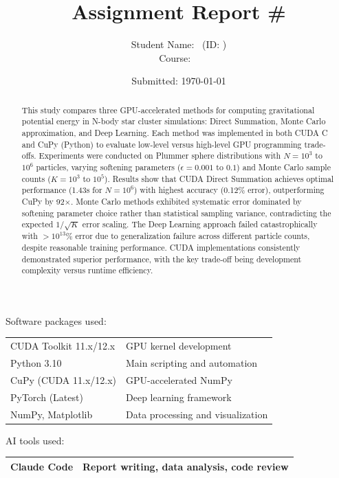 \documentclass[11pt,a4paper]{article}
\title{Assignment Report \#\assignmentnumber \\ \assignmenttitle}
\author{Student Name: \studentname \ (ID: \studentid) \\ Course: \coursecode \ \coursename}
\date{Submitted: \today}
\begin{document}
\maketitle

\begin{center}
{Software packages used:} \\
\begin{tabular}{|l|l|}
\hline
CUDA Toolkit 11.x/12.x & GPU kernel development \\
Python 3.10 & Main scripting and automation \\
CuPy (CUDA 11.x/12.x) & GPU-accelerated NumPy \\
PyTorch (Latest) & Deep learning framework \\
NumPy, Matplotlib & Data processing and visualization \\
\hline
\end{tabular}
\end{center}

\begin{center}
{AI tools used:} \\
\begin{tabular}{|l|l|}
\hline
Claude Code & Report writing, data analysis, code review \\
\hline
\end{tabular}
\end{center}
\vspace{2em}

\begin{abstract}
\noindent
This study compares three GPU-accelerated methods for computing gravitational potential energy in N-body star cluster simulations: Direct Summation, Monte Carlo approximation, and Deep Learning. Each method was implemented in both CUDA C and CuPy (Python) to evaluate low-level versus high-level GPU programming trade-offs. Experiments were conducted on Plummer sphere distributions with $N = 10^3$ to $10^6$ particles, varying softening parameters ($\epsilon = 0.001$ to $0.1$) and Monte Carlo sample counts ($K = 10^3$ to $10^5$). Results show that CUDA Direct Summation achieves optimal performance (1.43s for $N=10^6$) with highest accuracy (0.12\% error), outperforming CuPy by 92×. Monte Carlo methods exhibited systematic error dominated by softening parameter choice rather than statistical sampling variance, contradicting the expected $1/\sqrt{K}$ error scaling. The Deep Learning approach failed catastrophically with $>10^{13}$\% error due to generalization failure across different particle counts, despite reasonable training performance. CUDA implementations consistently demonstrated superior performance, with the key trade-off being development complexity versus runtime efficiency.
\end{abstract}
\end{document}

